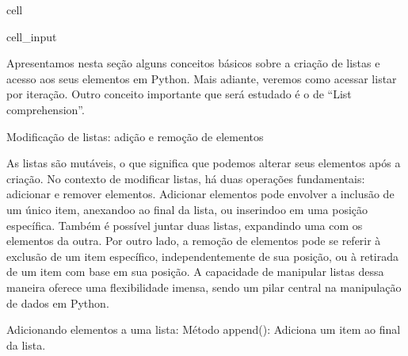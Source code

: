 \documentclass[letterpaper,10pt,english]{jupyterBook}
\begin{document}
\begin{sphinxuseclass}{cell}\begin{sphinxVerbatimInput}

\begin{sphinxuseclass}{cell_input}
\begin{sphinxVerbatim}[commandchars=\\\{\}]
  
 
\end{sphinxVerbatim}

\end{sphinxuseclass}\end{sphinxVerbatimInput}

\end{sphinxuseclass}
\sphinxAtStartPar
Apresentamos nesta seção alguns conceitos básicos sobre a criação de listas e acesso aos seus elementos em Python. Mais adiante, veremos como acessar listar por iteração. Outro conceito importante que será estudado é o de “List comprehension”.

\sphinxAtStartPar
Modificação de listas: adição e remoção de elementos

\sphinxAtStartPar
As listas são mutáveis, o que significa que podemos alterar seus elementos após a criação. No contexto de modificar listas, há duas operações fundamentais: adicionar e remover elementos. Adicionar elementos pode envolver a inclusão de um único item, anexando\sphinxhyphen{}o ao final da lista, ou inserindo\sphinxhyphen{}o em uma posição específica. Também é possível juntar duas listas, expandindo uma com os elementos da outra. Por outro lado, a remoção de elementos pode se referir à exclusão de um item específico, independentemente de sua posição, ou à retirada de um item com base em sua posição. A capacidade de manipular listas dessa maneira oferece uma flexibilidade imensa, sendo um pilar central na manipulação de dados em Python.

\sphinxAtStartPar
Adicionando elementos a uma lista:
Método append(): Adiciona um item ao final da lista.
\end{document}
